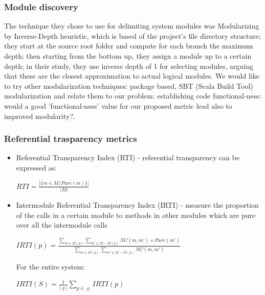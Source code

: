\documentclass{article}
\begin{document}
\subsubsection{Module discovery}
The technique they chose to use for delimiting system modules  was Modularizing by  Inverse-Depth heuristic, which is based of the project's file directory structure; they start at the source root folder and compute for each branch the maximum depth; then starting from the bottom up, they assign a module up to a certain depth; in their study, they use inverse depth of 1 for selecting modules, arguing that these are the closest approximation to actual logical modules. We would like to try other modularization techniques: package based, SBT (Scala Build Tool)  modularization and relate them to our problem: establishing code functional-ness: would a good 'functional-ness' value for our proposed metric lead also to improved modularity?.\par

\subsubsection{Referential trasparency metrics}

\begin{itemize}
\item Referential Transparency Index (RTI) - referential transparency can be expressed as:  

\begin{center}
\begin{math}
  RTI = \frac{ | \{ m \in M / Pure(m) \} | } { | M | }
\end{math}
\end{center}

\item Intermodule Referential Transparency Index (IRTI) - measure the proportion of the calls in a certain module to methods in other modules which are pure over all the intermodule calls

\begin{center}
$ IRTI(p) = \frac {\sum_{m \in M(p)} \sum_{m' \in  {M - M(p)}} NC(m,m') \times Pure(m')} {\sum_{m \in M(p)} \sum_{m' \in {M - M(p)}} NC(m,m')} $
\end{center}

For the entire system: 

\begin{center}
$ {IRTI(S) = \frac {1} {|\varrho|} \sum_{p \in \varrho} IRTI(p)} $ 
\end{center}
\end{itemize}
\end{document}
